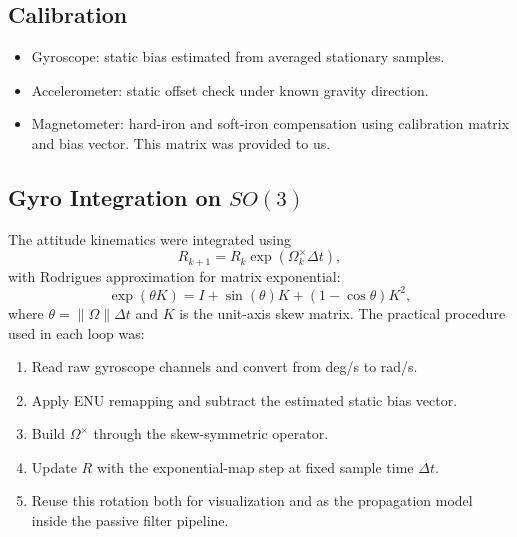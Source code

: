 \documentclass[12pt,a4paper]{article}
\begin{document}
\subsection{Calibration}
\begin{itemize}[leftmargin=1.5em]
    \item Gyroscope: static bias estimated from averaged stationary samples.
    \item Accelerometer: static offset check under known gravity direction.
    \item Magnetometer: hard-iron and soft-iron compensation using calibration matrix and bias vector. This matrix was provided to us.
\end{itemize}

\subsection{Gyro Integration on $SO(3)$}
The attitude kinematics were integrated using
\[
R_{k+1} = R_k\exp(\Omega_k^{\times}\Delta t),
\]
with Rodrigues approximation for matrix exponential:
\[
\exp(\theta K) = I + \sin(\theta)K + (1-\cos\theta)K^2,
\]
where $\theta = \|\Omega\|\Delta t$ and $K$ is the unit-axis skew matrix.
The practical procedure used in each loop was:
\begin{enumerate}[leftmargin=1.5em]
    \item Read raw gyroscope channels and convert from deg/s to rad/s.
    \item Apply ENU remapping and subtract the estimated static bias vector.
    \item Build $\Omega^{\times}$ through the skew-symmetric operator.
    \item Update $R$ with the exponential-map step at fixed sample time $\Delta t$.
    \item Reuse this rotation both for visualization and as the propagation model inside the passive filter pipeline.
\end{enumerate}
\end{document}
